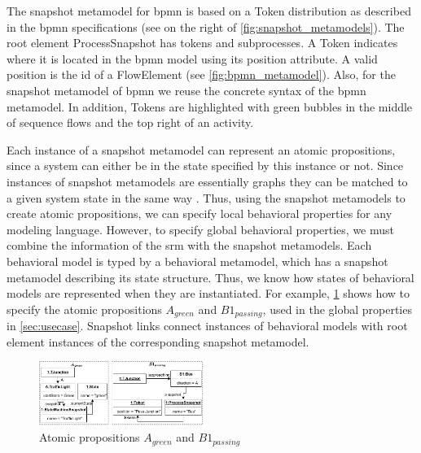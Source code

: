 \documentclass{jot}
\begin{document}
The snapshot metamodel for \gls*{bpmn} is based on a \textsf{Token} distribution as described in the \gls*{bpmn} specifications \cite{objectmanagementgroupBusinessProcessModel2013} (see on the right of \cref{fig:snapshot_metamodels}).
The root element \textsf{ProcessSnapshot} has \textsf{tokens} and \textsf{subprocesses}.
A \textsf{Token} indicates where it is located in the \gls*{bpmn} model using its \textsf{position} attribute.
A valid \textsf{position} is the \textsf{id} of a \textsf{FlowElement} (see \cref{fig:bpmn_metamodel}).
Also, for the snapshot metamodel of \gls*{bpmn} we reuse the concrete syntax of the \gls*{bpmn} metamodel.
In addition, \textsf{Token}s are highlighted with green bubbles in the middle of sequence flows and the top right of an activity.

Each instance of a snapshot metamodel can represent an atomic propositions, since a system can either be in the state specified by this instance or not.
Since instances of snapshot metamodels are essentially graphs they can be matched to a given system state in the same way \cite{dacostacavalheiroSpecificationPatternsProperties2012}.
Thus, using the snapshot metamodels to create atomic propositions, we can specify local behavioral properties for any modeling language.
However, to specify global behavioral properties, we must combine the information of the \gls*{srm} with the snapshot metamodels.
Each behavioral model is typed by a behavioral metamodel, which has a snapshot metamodel describing its state structure.
Thus, we know how states of behavioral models are represented when they are instantiated.
For example, \cref{fig:atomic_propositions} shows how to specify the atomic propositions $A_{green}$ and $B1_{passing}$, used in the global properties in \autoref{sec:usecase}.
Snapshot links connect instances of behavioral models with root element instances of the corresponding snapshot metamodel. 

\begin{figure}[h]
    \centering
    \includegraphics[width=0.475\textwidth]{figures/atomic_props.pdf}
    \caption{Atomic propositions $A_{green}$ and $B1_{passing}$}
    \label{fig:atomic_propositions}
\end{figure}
\end{document}
